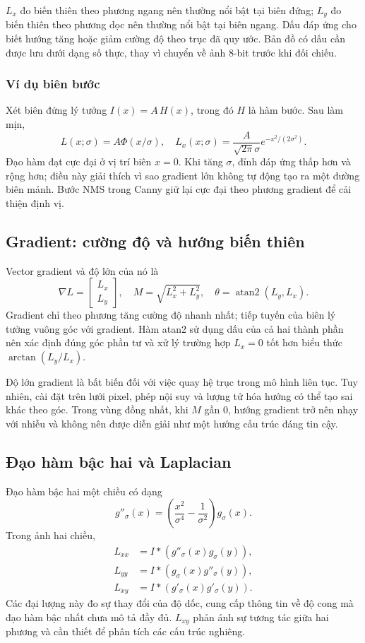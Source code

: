 $L_x$ đo biến thiên theo phương ngang nên thường nổi bật tại biên đứng; $L_y$ đo biến thiên theo phương dọc nên thường nổi bật tại biên ngang. Dấu đáp ứng cho biết hướng tăng hoặc giảm cường độ theo trục đã quy ước. Bản đồ có dấu cần được lưu dưới dạng số thực, thay vì chuyển về ảnh 8-bit trước khi đối chiếu.

\subsubsection{Ví dụ biên bước}
Xét biên đứng lý tưởng $I(x)=A\,H(x)$, trong đó $H$ là hàm bước. Sau làm mịn,
\begin{equation}
L(x;\sigma)=A\Phi(x/\sigma),\quad
L_x(x;\sigma)=\frac{A}{\sqrt{2\pi}\sigma}e^{-x^2/(2\sigma^2)}.
\end{equation}
Đạo hàm đạt cực đại ở vị trí biên $x=0$. Khi tăng $\sigma$, đỉnh đáp ứng thấp hơn và rộng hơn; điều này giải thích vì sao gradient lớn không tự động tạo ra một đường biên mảnh. Bước NMS trong Canny giữ lại cực đại theo phương gradient để cải thiện định vị.

\subsection{Gradient: cường độ và hướng biến thiên}
Vector gradient và độ lớn của nó là
\begin{equation}
\nabla L=\begin{bmatrix}L_x\\L_y\end{bmatrix},\quad
M=\sqrt{L_x^2+L_y^2},\quad
\theta=\operatorname{atan2}(L_y,L_x).
\end{equation}
Gradient chỉ theo phương tăng cường độ nhanh nhất; tiếp tuyến của biên lý tưởng vuông góc với gradient. Hàm atan2 sử dụng dấu của cả hai thành phần nên xác định đúng góc phần tư và xử lý trường hợp $L_x=0$ tốt hơn biểu thức $\arctan(L_y/L_x)$.

Độ lớn gradient là bất biến đối với việc quay hệ trục trong mô hình liên tục. Tuy nhiên, cài đặt trên lưới pixel, phép nội suy và lượng tử hóa hướng có thể tạo sai khác theo góc. Trong vùng đồng nhất, khi $M$ gần 0, hướng gradient trở nên nhạy với nhiễu và không nên được diễn giải như một hướng cấu trúc đáng tin cậy.

\subsection{Đạo hàm bậc hai và Laplacian}
Đạo hàm bậc hai một chiều có dạng
\begin{equation}
g''_\sigma(x)=\left(\frac{x^2}{\sigma^4}-\frac1{\sigma^2}\right)g_\sigma(x).
\end{equation}
Trong ảnh hai chiều,
\begin{align}
L_{xx}&=I*(g''_\sigma(x)g_\sigma(y)),\\
L_{yy}&=I*(g_\sigma(x)g''_\sigma(y)),\\
L_{xy}&=I*(g'_\sigma(x)g'_\sigma(y)).
\end{align}
Các đại lượng này đo sự thay đổi của độ dốc, cung cấp thông tin về độ cong mà đạo hàm bậc nhất chưa mô tả đầy đủ. $L_{xy}$ phản ánh sự tương tác giữa hai phương và cần thiết để phân tích các cấu trúc nghiêng.

